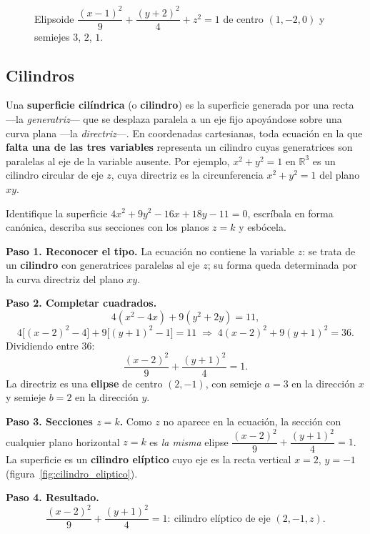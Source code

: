 \begin{figure}[!htbp]
\centering
{}
\caption{Elipsoide $\dfrac{(x-1)^2}{9}+\dfrac{(y+2)^2}{4}+z^2=1$ de centro
  $(1,-2,0)$ y semiejes $3$, $2$, $1$.}
\label{fig:elipsoide_trasladado}
\end{figure}

\subsection{Cilindros}

Una \textbf{superficie cilíndrica} (o \textbf{cilindro}) es la superficie
generada por una recta —la \emph{generatriz}— que se desplaza paralela a un
eje fijo apoyándose sobre una curva plana —la \emph{directriz}—. En
coordenadas cartesianas, toda ecuación en la que \textbf{falta una de las
tres variables} representa un cilindro cuyas generatrices son paralelas al
eje de la variable ausente. Por ejemplo, $x^2+y^2=1$ en $\mathbb{R}^3$ es un
cilindro circular de eje $z$, cuya directriz es la circunferencia
$x^2+y^2=1$ del plano $xy$.

\begin{prob}
Identifique la superficie $4x^2+9y^2-16x+18y-11=0$, escríbala en forma
canónica, describa sus secciones con los planos $z=k$ y esbócela.
\begin{myproof}
\textbf{Paso 1. Reconocer el tipo.} La ecuación no contiene la variable $z$:
se trata de un \textbf{cilindro} con generatrices paralelas al eje $z$; su
forma queda determinada por la curva directriz del plano $xy$.

\textbf{Paso 2. Completar cuadrados.}
\[
  4(x^2-4x)+9(y^2+2y)=11,
\]
\[
  4\bigl[(x-2)^2-4\bigr]+9\bigl[(y+1)^2-1\bigr]=11
  \;\Longrightarrow\;
  4(x-2)^2+9(y+1)^2=36.
\]
Dividiendo entre $36$:
\[
  \frac{(x-2)^2}{9}+\frac{(y+1)^2}{4}=1.
\]
La directriz es una \textbf{elipse} de centro $(2,-1)$, con semieje $a=3$ en
la dirección $x$ y semieje $b=2$ en la dirección $y$.

\textbf{Paso 3. Secciones $z=k$.} Como $z$ no aparece en la ecuación, la
sección con cualquier plano horizontal $z=k$ es \emph{la misma} elipse
$\dfrac{(x-2)^2}{9}+\dfrac{(y+1)^2}{4}=1$. La superficie es un
\textbf{cilindro elíptico} cuyo eje es la recta vertical $x=2$, $y=-1$
(figura~\ref{fig:cilindro_eliptico}).

\textbf{Paso 4. Resultado.}
\[
  \boxed{\ \frac{(x-2)^2}{9}+\frac{(y+1)^2}{4}=1:\ \text{cilindro elíptico de
  eje } (2,-1,z).\ }
\]
\end{myproof}
\end{prob}

